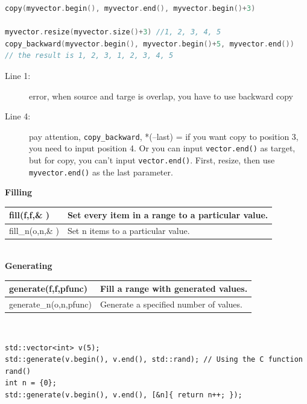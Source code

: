 \documentclass[a4paper,11pt,twoside]{book}
\newcommand{\tophline}{\hline }
\newcommand{\bottomhline}{\\ \hline }
\newcommand{\tophline}{ }
\newcommand{\bottomhline}{ }
\begin{document}
\begin{lstlisting}[frame=single, language=c++]
copy(myvector.begin(), myvector.end(), myvector.begin()+3) 

myvector.resize(myvector.size()+3) //1, 2, 3, 4, 5
copy_backward(myvector.begin(), myvector.begin()+5, myvector.end())
// the result is 1, 2, 3, 1, 2, 3, 4, 5
\end{lstlisting}
\begin{description}
	\item[Line 1:] error, when source and targe is overlap, you have to use backward copy
	\item[Line 4:]pay attention, \texttt{copy\_backward}, *(--last) = if you want copy to position 3, you need to input position 4. Or you can input \texttt{vector.end()} as target, but for copy, you can't input \texttt{vector.end()}. First, resize, then use\texttt{ myvector.end()} as the last parameter.

\end{description} 

\textbf{Filling} \\
\begin{tabular}{| p{} |p{}|}
\tophline fill(f,f,\& ) & Set every item in a range to a particular value.  \\
\tophline fill\_n(o,n,\& )  & Set n items to a particular value.   \bottomhline
\end{tabular} \\


\textbf{Generating} \\
\begin{tabular}{| p{} |p{}|}
\tophline generate(f,f,pfunc)  & Fill a range with generated values.   \\
\tophline generate\_n(o,n,pfunc)  & Generate a specified number of values.   \bottomhline
\end{tabular} \\

\begin{lstlisting}[numbers=none]
std::vector<int> v(5);
std::generate(v.begin(), v.end(), std::rand); // Using the C function rand()
int n = {0};
std::generate(v.begin(), v.end(), [&n]{ return n++; });
\end{lstlisting}
\end{document}
